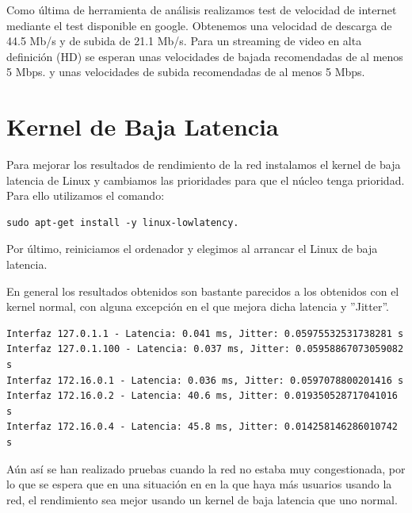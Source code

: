 Como última de herramienta de análisis realizamos test de velocidad de internet mediante el test disponible en google.
Obtenemos una velocidad de descarga de 44.5 Mb/s y de subida de 21.1 Mb/s. Para un streaming de video en alta definición (HD) se esperan unas velocidades de bajada recomendadas de al menos 5 Mbps. y unas velocidades de subida recomendadas de al menos 5 Mbps.


\section{Kernel de Baja Latencia}

Para mejorar los resultados de rendimiento de la red instalamos el kernel de baja latencia de Linux y cambiamos las prioridades para que el núcleo tenga prioridad. Para ello utilizamos el comando:
\begin{verbatim}
sudo apt-get install -y linux-lowlatency.
\end{verbatim}
Por último, reiniciamos el ordenador y elegimos al arrancar el Linux de baja latencia.

En general los resultados obtenidos son bastante parecidos a los obtenidos con el kernel normal, con alguna excepción en el que mejora dicha latencia y ''Jitter''. 

\begin{lstlisting}[caption={Salida del fichero python que calcula retardos entre interfaces con kernel de baja latencia.}]
Interfaz 127.0.1.1 - Latencia: 0.041 ms, Jitter: 0.05975532531738281 s
Interfaz 127.0.1.100 - Latencia: 0.037 ms, Jitter: 0.05958867073059082 s
Interfaz 172.16.0.1 - Latencia: 0.036 ms, Jitter: 0.0597078800201416 s
Interfaz 172.16.0.2 - Latencia: 40.6 ms, Jitter: 0.019350528717041016 s
Interfaz 172.16.0.4 - Latencia: 45.8 ms, Jitter: 0.014258146286010742 s
\end{lstlisting}

Aún así se han realizado pruebas cuando la red no estaba muy congestionada, por lo que se espera que en una situación en en la que haya más usuarios usando la red, el rendimiento sea mejor usando un kernel de baja latencia que uno normal. 

